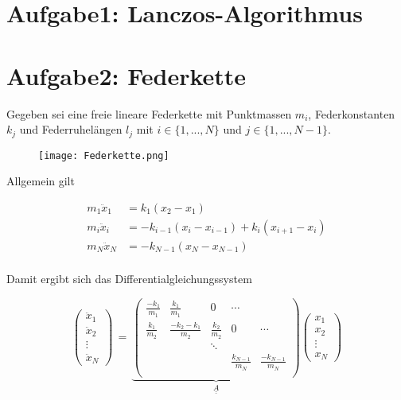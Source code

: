 



\maketitle

\section*{Aufgabe1: Lanczos-Algorithmus}

\section*{Aufgabe2: Federkette}
Gegeben sei eine freie lineare Federkette mit Punktmassen $m_i$, Federkonstanten $k_j$ und Federruhelängen $l_j$ mit $i \in \{1, ..., N\}$ und $j \in \{1, ..., N-1\}$.
\begin{figure}[h]
    \centering
    \texttt{[image: Federkette.png]}
    \label{fig:1a}
\end{figure}

\noindent
Allgemein gilt

\begin{align*}
  m_1\ddot{x}_1 &= k_1(x_2 - x_1) \\
  m_i\ddot{x}_i &= -k_{i-1} (x_i - x_{i-1}) + k_i(x_{i+1}-x_i) \\
  m_N\ddot{x}_N &= -k_{N-1}(x_N - x_{N-1}) \\
\end{align*}

\noindent
Damit ergibt sich das Differentialgleichungssystem

\begin{equation*}
  \left(\begin{array}{c} \ddot{x}_1 \\ \ddot{x}_2 \\ \vdots \\ \ddot{x}_N \end{array}\right)\, = \,
  \underbrace{\left(
        \begin{array}{ccccc}
          \frac{-k_1}{m_1} & \frac{k_1}{m_1} & 0 & \cdots & \\
          \frac{k_1}{m_2} & \frac{-k_2-k_1}{m_2} & \frac{k_2}{m_2} & 0 & \cdots \\
          & & \ddots & & \\
          & & & \frac{k_{N-1}}{m_N} & \frac{-k_{N-1}}{m_N}\\
        \end{array}\right)}_{\underline{\underline{A}}}
        \left(\begin{array}{c} x_1 \\ x_2 \\ \vdots \\ x_N \end{array}\right)
\end{equation*}

